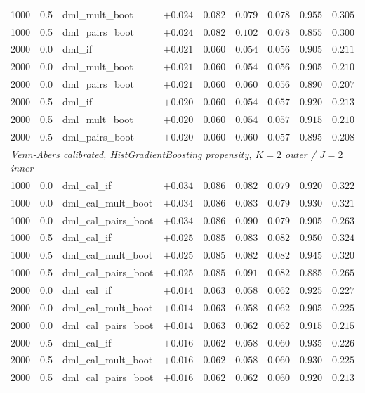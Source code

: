 \begin{table}[H]
\begin{tabular}{lllrrrrrr}
1000 & 0.5 & dml\_mult\_boot & $+0.024$ & $0.082$ & $0.079$ & $0.078$ & $0.955$ & $0.305$ \\
1000 & 0.5 & dml\_pairs\_boot & $+0.024$ & $0.082$ & $0.102$ & $0.078$ & $0.855$ & $0.300$ \\
2000 & 0.0 & dml\_if         & $+0.021$ & $0.060$ & $0.054$ & $0.056$ & $0.905$ & $0.211$ \\
2000 & 0.0 & dml\_mult\_boot & $+0.021$ & $0.060$ & $0.054$ & $0.056$ & $0.905$ & $0.210$ \\
2000 & 0.0 & dml\_pairs\_boot & $+0.021$ & $0.060$ & $0.060$ & $0.056$ & $0.890$ & $0.207$ \\
2000 & 0.5 & dml\_if         & $+0.020$ & $0.060$ & $0.054$ & $0.057$ & $0.920$ & $0.213$ \\
2000 & 0.5 & dml\_mult\_boot & $+0.020$ & $0.060$ & $0.054$ & $0.057$ & $0.915$ & $0.210$ \\
2000 & 0.5 & dml\_pairs\_boot & $+0.020$ & $0.060$ & $0.060$ & $0.057$ & $0.895$ & $0.208$ \\
\midrule
\multicolumn{9}{l}{\emph{Venn-Abers calibrated, HistGradientBoosting propensity, $K{=}2$ outer / $J{=}2$ inner}} \\
1000 & 0.0 & dml\_cal\_if         & $+0.034$ & $0.086$ & $0.082$ & $0.079$ & $0.920$ & $0.322$ \\
1000 & 0.0 & dml\_cal\_mult\_boot & $+0.034$ & $0.086$ & $0.083$ & $0.079$ & $0.930$ & $0.321$ \\
1000 & 0.0 & dml\_cal\_pairs\_boot & $+0.034$ & $0.086$ & $0.090$ & $0.079$ & $0.905$ & $0.263$ \\
1000 & 0.5 & dml\_cal\_if         & $+0.025$ & $0.085$ & $0.083$ & $0.082$ & $0.950$ & $0.324$ \\
1000 & 0.5 & dml\_cal\_mult\_boot & $+0.025$ & $0.085$ & $0.082$ & $0.082$ & $0.945$ & $0.320$ \\
1000 & 0.5 & dml\_cal\_pairs\_boot & $+0.025$ & $0.085$ & $0.091$ & $0.082$ & $0.885$ & $0.265$ \\
2000 & 0.0 & dml\_cal\_if         & $+0.014$ & $0.063$ & $0.058$ & $0.062$ & $0.925$ & $0.227$ \\
2000 & 0.0 & dml\_cal\_mult\_boot & $+0.014$ & $0.063$ & $0.058$ & $0.062$ & $0.905$ & $0.225$ \\
2000 & 0.0 & dml\_cal\_pairs\_boot & $+0.014$ & $0.063$ & $0.062$ & $0.062$ & $0.915$ & $0.215$ \\
2000 & 0.5 & dml\_cal\_if         & $+0.016$ & $0.062$ & $0.058$ & $0.060$ & $0.935$ & $0.226$ \\
2000 & 0.5 & dml\_cal\_mult\_boot & $+0.016$ & $0.062$ & $0.058$ & $0.060$ & $0.930$ & $0.225$ \\
2000 & 0.5 & dml\_cal\_pairs\_boot & $+0.016$ & $0.062$ & $0.062$ & $0.060$ & $0.920$ & $0.213$ \\
\bottomrule
\end{tabular}
\end{table}
